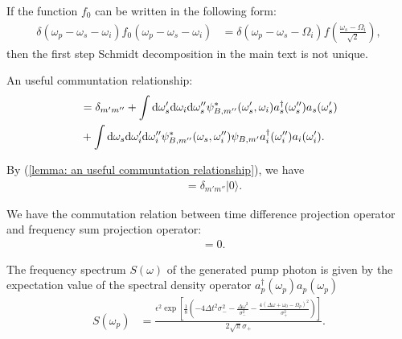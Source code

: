 \documentclass[../../note.tex]{subfiles}
\begin{document}
\begin{lemma}
    If the function $f_0$ can be written in the following form:
    \begin{align}
        \delta(\omega_p - \omega_s -\omega_i) f_0(\omega_p -\omega_s -\omega_i)
        &= \delta(\omega_p - \omega_s - \Omega_i) f(\frac{\omega_s-\Omega_i}{\sqrt{2}}),
    \end{align}
    then the first step Schmidt decomposition in the main text is not unique.
\end{lemma}

\begin{lemma}
    \label{lemma: an useful communtation relationship}
    An useful communtation relationship:
    \begin{align}
        [B_{m'},B^\dagger_{m''}]
        &= \delta_{m'm''} + \int {\rm d}\omega_s'{\rm d}\omega_i{\rm d}\omega_s''\psi^{\ast}_{B,m''}(\omega_s',\omega_i)a^\dagger_{s}(\omega_s'')a_s(\omega_s') \\
        &+\int {\rm d}\omega_s{\rm d}\omega_i'{\rm d}\omega_i''\psi^{\ast}_{B,m''}(\omega_s,\omega_i'')\psi_{B,m'}a^\dagger_{i}(\omega_i'')a_i(\omega_i').
    \end{align}
\end{lemma}

\begin{corollary}
    By (\ref{lemma: an useful communtation relationship}), we have
    \begin{align}
        [B_{m'},B_{m''}^\dagger]
        &= \delta_{m'm''} \vert 0 \rangle.
    \end{align}
\end{corollary}

\begin{lemma}
    We have the commutation relation between time difference projection operator and frequency sum projection operator:
    \begin{align}
        [P_{\delta_{\omega}}(\omega), P_{\delta_t}(t)]
        &= 0.
    \end{align}
\end{lemma}

\begin{lemma}
    The frequency spectrum $S(\omega)$ of the generated pump photon is given by the expectation value of the spectral density operator $a_p^\dagger(\omega_p)a_{p}(\omega_p)$ 
    \begin{align}
        S(\omega_p)
        &= \frac{\epsilon^2 \exp\left[\frac{1}{8}\left(-4 \Delta t^2 \sigma_-^2 - \frac{\Delta \omega^2}{\sigma_-^2} - \frac{4(\Delta \omega + \omega_0 - \Omega_p)^2}{\sigma_+^2} \right)\right]}{2 \sqrt{\pi} \sigma_+}.
    \end{align}
\end{lemma}
\end{document}
